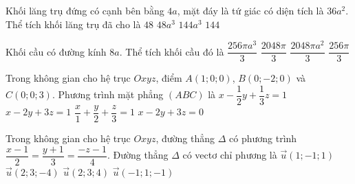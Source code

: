 \begin{ex}%
	Khối lăng trụ đứng có cạnh bên bằng $4a$, mặt đáy là tứ giác có diện tích là $36a^2$. Thể tích khối lăng trụ đã cho là
	\choice
	{$48$}
	{$48a^3$}
	{\True $144a^3$}
	{$144$}
\end{ex}

\begin{ex}%
	Khối cầu có đường kính $8a$. Thể tích khối cầu đó là
	\choice
	{\True $\dfrac{256\pi a^3}{3}$}
	{$\dfrac{2048\pi}{3}$}
	{$\dfrac{2048\pi a^2}{3}$}
	{$\dfrac{256\pi}{3}$}
\end{ex}

\begin{ex}%
	Trong không gian cho hệ trục $Oxyz$, điểm $A(1;0;0)$, $B(0;-2;0)$ và $C(0;0;3)$. Phương trình mặt phẳng $(ABC)$ là
	\choice
	{\True $x-\dfrac{1}{2}y+\dfrac{1}{3}z=1$}
	{$x-2y+3z=1$}
	{$\dfrac{x}{1}+\dfrac{y}{2}+\dfrac{z}{3}=1$}
	{$x-2y+3z=0$}
\end{ex}

\begin{ex}%
	Trong không gian cho hệ trục $Oxyz$, đường thẳng $\Delta$ có phương trình $\dfrac{x-1}{2}=\dfrac{y+1}{3}=\dfrac{-z-1}{4}$. Đường thẳng $\Delta$ có vectơ chỉ phương là 
	\choice
	{$\overrightarrow{u}(1;-1; 1)$}
	{\True $\overrightarrow{u}(2; 3;-4)$}
	{$\overrightarrow{u}(2; 3; 4)$}
	{$\overrightarrow{u}(-1; 1;-1)$}
\end{ex}

